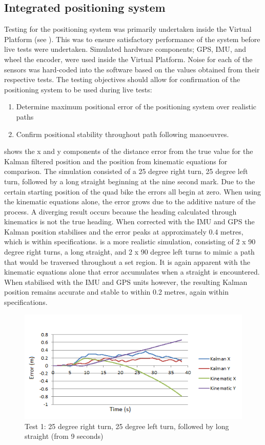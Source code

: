 \documentclass[main.tex]{subfiles}
\begin{document}
\subsection{Integrated positioning system}
Testing for the positioning system was primarily undertaken inside the Virtual Platform (see ). This was to ensure satisfactory performance of the system before live tests were undertaken. Simulated hardware components; GPS, IMU, and wheel the encoder, were used inside the Virtual Platform. Noise for each of the sensors was hard-coded into the software based on the values obtained from their respective tests. The testing objectives should allow for confirmation of the positioning system to be used during live tests:
\begin{enumerate}
\item Determine maximum positional error of the positioning system over realistic paths
\item Confirm positional stability throughout path following manoeuvres.
\end{enumerate}
 shows the x and y components of the distance error from the true value for the Kalman filtered position and the position from kinematic equations for comparison. The simulation consisted of a 25 degree right turn, 25 degree left turn, followed by a long straight beginning at the nine second mark. Due to the certain starting position of the quad bike the errors all begin at zero. When using the kinematic equations alone, the error grows due to the additive nature of the process. A diverging result occurs because the heading calculated through kinematics is not the true heading. When corrected with the IMU and GPS the Kalman position stabilises and the error peaks at approximately 0.4 metres, which is within specifications.  is a more realistic simulation, consisting of 2 x 90 degree right turns, a long straight, and 2 x 90 degree left turns to mimic a path that would be traversed throughout a set region. It is again apparent with the kinematic equations alone that error accumulates when a straight is encountered. When stabilised with the IMU and GPS units however, the resulting Kalman position remains accurate and stable to within 0.2 metres, again within specifications.
\begin{figure}[ht]
\includegraphics[width=\textwidth]{5-Testing/position_error_test_1.png}
\centering
\caption[Positioning system test 1]{Test 1: 25 degree right turn, 25 degree left turn, followed by long straight (from 9 seconds)}
\end{figure}
\end{document}
